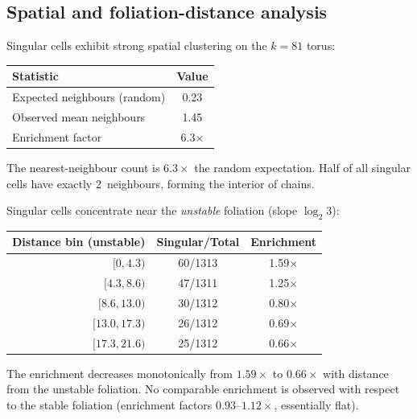 \documentclass[11pt,a4paper]{article}
\theoremstyle{plain}
\theoremstyle{definition}
\begin{document}
\subsection{Spatial and foliation-distance analysis}

\begin{empirical}\label{obs:spatial-clustering}
    Singular cells exhibit strong spatial clustering on the $k{=}81$ torus:
    \begin{center}
    \renewcommand{\arraystretch}{1.15}
    \begin{tabular}{lc}
        \toprule
        Statistic & Value \\
        \midrule
        Expected neighbours (random) & 0.23 \\
        Observed mean neighbours & 1.45 \\
        Enrichment factor & 6.3$\times$ \\
        \bottomrule
    \end{tabular}
    \end{center}
    The nearest-neighbour count is $6.3\times$ the random expectation.
    Half of all singular cells have exactly 2~neighbours, forming the
    interior of chains.
\end{empirical}

\begin{empirical}\label{obs:foliation-enrichment}
    Singular cells concentrate near the \emph{unstable} foliation
    (slope $\log_2 3$):
    \begin{center}
    \renewcommand{\arraystretch}{1.15}
    \begin{tabular}{rcc}
        \toprule
        Distance bin (unstable) & Singular/Total & Enrichment \\
        \midrule
        $[0, 4.3)$ & 60/1313 & 1.59$\times$ \\
        $[4.3, 8.6)$ & 47/1311 & 1.25$\times$ \\
        $[8.6, 13.0)$ & 30/1312 & 0.80$\times$ \\
        $[13.0, 17.3)$ & 26/1312 & 0.69$\times$ \\
        $[17.3, 21.6)$ & 25/1312 & 0.66$\times$ \\
        \bottomrule
    \end{tabular}
    \end{center}
    The enrichment decreases monotonically from $1.59\times$ to
    $0.66\times$ with distance from the unstable foliation.  No
    comparable enrichment is observed with respect to the stable
    foliation (enrichment factors $0.93$--$1.12\times$, essentially
    flat).
\end{empirical}
\end{document}
